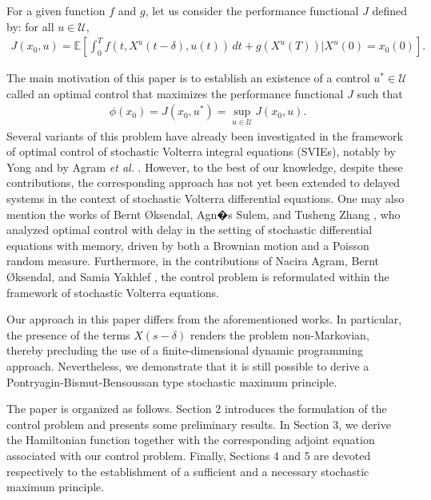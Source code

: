\documentclass[12pt]{article}
\theoremstyle{remark}
\numberwithin{equation}{section}
\begin{document}
For a given function $f$ and $g$, let us consider the performance functional $J$ defined by: for all $u\in \mathcal{U}$,
\begin{eqnarray*}
J(x_0,u) = \mathbb{E} \left[ \int_0^T f(t, X^{u}(t-\delta), u(t)) \, dt + g(X^{u}(T))|X^{u}(0)=x_{0}(0) \right].
\end{eqnarray*}

The main motivation of this paper is to establish an existence of a control $u^{*}\in \mathcal{U}$ called an optimal control that maximizes the performance functional $J$ such that
\begin{eqnarray}\label{CP}
	\phi(x_{0})=J(x_0,u^*)=\sup_{u\in \mathcal{U}} J(x_0,u).
\end{eqnarray}
Several variants of this problem have already been investigated in the framework of optimal control of stochastic Volterra integral equations (SVIEs), notably by Yong \cite{yong2006,yong2008ptf} and by Agram \emph{et al.} \cite{Agram2015,Agram2018}. However, to the best of our knowledge, despite these contributions, the corresponding approach has not yet been extended to delayed systems in the context of stochastic Volterra differential equations. One may also mention the works of Bernt \O ksendal, Agn�s Sulem, and Tusheng Zhang \cite{Elsanousi2000}, who analyzed optimal control with delay in the setting of stochastic differential equations with memory, driven by both a Brownian motion and a Poisson random measure. Furthermore, in the contributions of Nacira Agram, Bernt \O ksendal, and Samia Yakhlef \cite{Agram2018}, the control problem is reformulated within the framework of stochastic Volterra equations.
  
Our approach in this paper differs from the aforementioned works. In particular, the presence of the terms $X(s-\delta)$ renders the problem non-Markovian, thereby precluding the use of a finite-dimensional dynamic programming approach. Nevertheless, we demonstrate that it is still possible to derive a Pontryagin-Bismut-Bensoussan type stochastic maximum principle.

The paper is organized as follows. Section 2 introduces the formulation of the control problem and presents some preliminary results. In Section 3, we derive the Hamiltonian function together with the corresponding adjoint equation associated with our control problem. Finally, Sections 4 and 5 are devoted respectively to the establishment of a sufficient and a necessary stochastic maximum principle.
\end{document}
